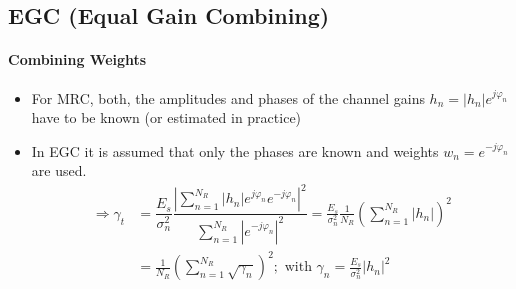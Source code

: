\documentclass[a4paper, 10pt]{article}
\begin{document}
\subsection{EGC (Equal Gain Combining)}

\paragraph*{Combining Weights}
\begin{itemize}
	\item For MRC, both, the amplitudes and phases of the channel gains $h_n=|h_n|e^{j\varphi_n}$ have to be known (or estimated in practice)
	\item In EGC it is assumed that only the phases are known and weights $w_n=e^{-j\varphi_n}$ are used.
\begin{align*}
	\Rightarrow \gamma_t &=\dfrac{E_s}{\sigma_n^2}\dfrac{\left|\sum\limits_{n=1}^{N_R}|h_n|e^{j\varphi_n}e^{-j\varphi_n}\right|^2}{\sum\limits^{N_R}_{n=1}\left|e^{-j\varphi_n}\right|^2}
	=\frac{E_s}{\sigma_n^2}\frac{1}{N_R}\left(\sum\limits^{N_R}_{n=1}|h_n|\right)^2\\
	&=\frac{1}{N_R}\left(\sum\limits_{n=1}^{N_R}\sqrt{\gamma_n}\right)^2;\text{  with  }\gamma_n=\frac{E_s}{\sigma_n^2}|h_n|^2
\end{align*}
\end{itemize}
\end{document}
